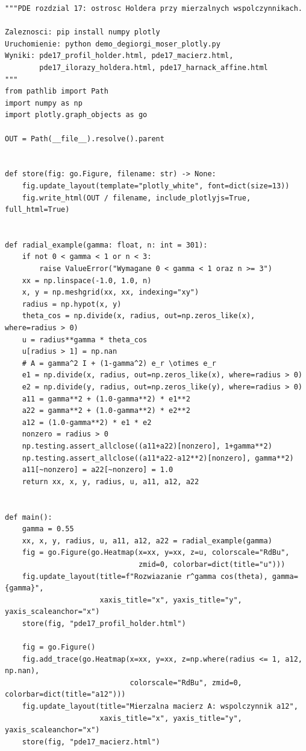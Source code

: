 \begin{lstlisting}[style=pythonpde,caption={Mierzalne współczynniki, regularność Höldera i Harnack (Plotly)},label={code:pde17-plotly}]
"""PDE rozdzial 17: ostrosc Holdera przy mierzalnych wspolczynnikach.

Zaleznosci: pip install numpy plotly
Uruchomienie: python demo_degiorgi_moser_plotly.py
Wyniki: pde17_profil_holder.html, pde17_macierz.html,
        pde17_ilorazy_holdera.html, pde17_harnack_affine.html
"""
from pathlib import Path
import numpy as np
import plotly.graph_objects as go

OUT = Path(__file__).resolve().parent


def store(fig: go.Figure, filename: str) -> None:
    fig.update_layout(template="plotly_white", font=dict(size=13))
    fig.write_html(OUT / filename, include_plotlyjs=True, full_html=True)


def radial_example(gamma: float, n: int = 301):
    if not 0 < gamma < 1 or n < 3:
        raise ValueError("Wymagane 0 < gamma < 1 oraz n >= 3")
    xx = np.linspace(-1.0, 1.0, n)
    x, y = np.meshgrid(xx, xx, indexing="xy")
    radius = np.hypot(x, y)
    theta_cos = np.divide(x, radius, out=np.zeros_like(x), where=radius > 0)
    u = radius**gamma * theta_cos
    u[radius > 1] = np.nan
    # A = gamma^2 I + (1-gamma^2) e_r \otimes e_r
    e1 = np.divide(x, radius, out=np.zeros_like(x), where=radius > 0)
    e2 = np.divide(y, radius, out=np.zeros_like(y), where=radius > 0)
    a11 = gamma**2 + (1.0-gamma**2) * e1**2
    a22 = gamma**2 + (1.0-gamma**2) * e2**2
    a12 = (1.0-gamma**2) * e1 * e2
    nonzero = radius > 0
    np.testing.assert_allclose((a11+a22)[nonzero], 1+gamma**2)
    np.testing.assert_allclose((a11*a22-a12**2)[nonzero], gamma**2)
    a11[~nonzero] = a22[~nonzero] = 1.0
    return xx, x, y, radius, u, a11, a12, a22


def main():
    gamma = 0.55
    xx, x, y, radius, u, a11, a12, a22 = radial_example(gamma)
    fig = go.Figure(go.Heatmap(x=xx, y=xx, z=u, colorscale="RdBu",
                               zmid=0, colorbar=dict(title="u")))
    fig.update_layout(title=f"Rozwiazanie r^gamma cos(theta), gamma={gamma}",
                      xaxis_title="x", yaxis_title="y", yaxis_scaleanchor="x")
    store(fig, "pde17_profil_holder.html")

    fig = go.Figure()
    fig.add_trace(go.Heatmap(x=xx, y=xx, z=np.where(radius <= 1, a12, np.nan),
                             colorscale="RdBu", zmid=0, colorbar=dict(title="a12")))
    fig.update_layout(title="Mierzalna macierz A: wspolczynnik a12",
                      xaxis_title="x", yaxis_title="y", yaxis_scaleanchor="x")
    store(fig, "pde17_macierz.html")


\end{lstlisting}

